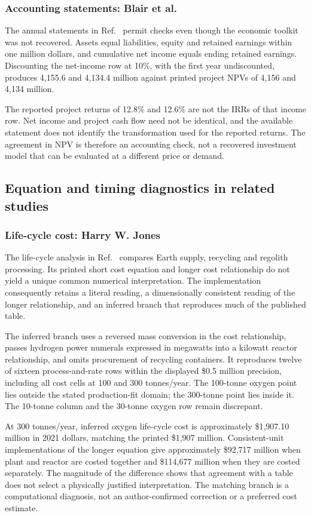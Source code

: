 \documentclass[final,5p,times,twocolumn]{elsarticle}
\begin{document}
\subsubsection{Accounting statements: Blair et al.}
The annual statements in Ref.~\cite{blair2002} permit checks even though the economic toolkit was not recovered. Assets equal liabilities, equity and retained earnings within one million dollars, and cumulative net income equals ending retained earnings. Discounting the net-income row at 10\%, with the first year undiscounted, produces 4,155.6 and 4,134.4 million against printed project NPVs of 4,156 and 4,134 million.

The reported project returns of 12.8\% and 12.6\% are not the IRRs of that income row. Net income and project cash flow need not be identical, and the available statement does not identify the transformation used for the reported returns. The agreement in NPV is therefore an accounting check, not a recovered investment model that can be evaluated at a different price or demand.

\subsection{Equation and timing diagnostics in related studies}
\subsubsection{Life-cycle cost: Harry W. Jones}
The life-cycle analysis in Ref.~\cite{jones2021} compares Earth supply, recycling and regolith processing. Its printed short cost equation and longer cost relationship do not yield a unique common numerical interpretation. The implementation consequently retains a literal reading, a dimensionally consistent reading of the longer relationship, and an inferred branch that reproduces much of the published table.

The inferred branch uses a reversed mass conversion in the cost relationship, passes hydrogen power numerals expressed in megawatts into a kilowatt reactor relationship, and omits procurement of recycling containers. It reproduces twelve of sixteen process-and-rate rows within the displayed \$0.5 million precision, including all cost cells at 100 and 300 tonnes/year. The 100-tonne oxygen point lies outside the stated production-fit domain; the 300-tonne point lies inside it. The 10-tonne column and the 30-tonne oxygen row remain discrepant.

At 300 tonnes/year, inferred oxygen life-cycle cost is approximately \$1,907.10 million in 2021 dollars, matching the printed \$1,907 million. Consistent-unit implementations of the longer equation give approximately \$92,717 million when plant and reactor are costed together and \$114,677 million when they are costed separately. The magnitude of the difference shows that agreement with a table does not select a physically justified interpretation. The matching branch is a computational diagnosis, not an author-confirmed correction or a preferred cost estimate.
\end{document}
